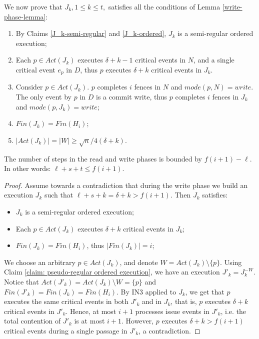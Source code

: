 We now prove that $J_k, 1 \leq k \leq t,$ satisfies all the conditions of Lemma \ref{write-phase-lemma}:
\begin{enumerate}[(1)]
	\item By Claims \ref{J_k-semi-regular} and \ref{J_k-ordered}, $J_k$ is a semi-regular ordered execution;
	\item Each $p \in Act(J_k)$ executes $\delta+k-1$ critical events in $N$, and a single critical event $e_p$ in $D$, thus $p$ executes $\delta+k$ critical events in $J_k$.
	\item Consider $p \in Act(J_k)$. $p$ completes $i$ fences in $N$ and $mode(p,N) = write$. The only event by $p$ in $D$ is a commit write, thus $p$ completes $i$ fences in $J_k$ and $mode(p,J_k) = write$;
	\item $Fin(J_k) = Fin(H_i)$;
	\item $|Act(J_k)| = |W| \geq \sqrt{n}/4(\delta+k)$.
\end{enumerate}

\begin{claim-section} \label{claim: write-upper-bound}
	The number of steps in the read and write phases is bounded by $f(i+1)-\ell$. In other words: $\ell+s+t \leq f(i+1)$.
\end{claim-section}

\begin{proof}
	Assume towards a contradiction that during the write phase we build an execution $J_k$ such that $\ell+s+k = \delta+k > f(i+1)$. Then $J_k$ satisfies:
	\begin{itemize}
		\item $J_k$ is a semi-regular ordered execution;
		\item Each $p \in Act(J_k)$ executes $\delta+k$ critical events in $J_k$;
		\item $Fin(J_k) = Fin(H_i)$, thus $|Fin(J_k)| = i$;
	\end{itemize}
	We choose an arbitrary $p \in Act(J_k)$, and denote $W = Act(J_k) \setminus \{p\}$. Using Claim \ref{claim: pseudo-regular ordered execution}, we have an execution $J'_k = J_k^{-W}$. Notice that $Act(J'_k) = Act(J_k) \setminus W = \{p\}$ and $Fin(J'_k) = Fin(J_k) = Fin(H_i)$. By IN3 applied to $J_k$, we get that $p$ executes the same critical events in both $J'_k$ and in $J_k$, that is, $p$ executes $\delta+k$ critical events in $J'_k$.
Hence, at most $i+1$ processes issue events in $J'_k$, i.e. the total contention of $J'_k$ is at most $i+1$. However, $p$ executes $\delta+k > f(i+1)$ critical events during a single passage in $J'_k$, a contradiction.
\end{proof}




